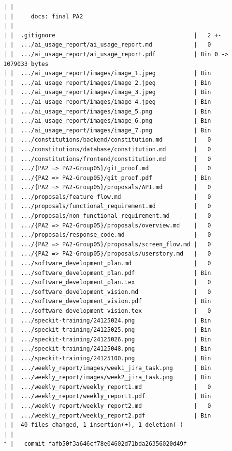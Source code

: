 \documentclass[12pt]{article}
\begin{document}
\begin{lstlisting}[numbers=none,breaklines=true]
| |
| |     docs: final PA2
| |
| |  .gitignore                                        |   2 +-
| |  .../ai_usage_report/ai_usage_report.md            |   0
| |  .../ai_usage_report/ai_usage_report.pdf           | Bin 0 -> 1079033 bytes
| |  .../ai_usage_report/images/image_1.jpeg           | Bin
| |  .../ai_usage_report/images/image_2.jpeg           | Bin
| |  .../ai_usage_report/images/image_3.jpeg           | Bin
| |  .../ai_usage_report/images/image_4.jpeg           | Bin
| |  .../ai_usage_report/images/image_5.png            | Bin
| |  .../ai_usage_report/images/image_6.png            | Bin
| |  .../ai_usage_report/images/image_7.png            | Bin
| |  .../constitutions/backend/constitution.md         |   0
| |  .../constitutions/database/constitution.md        |   0
| |  .../constitutions/frontend/constitution.md        |   0
| |  .../{PA2 => PA2-Group05}/git_proof.md             |   0
| |  .../{PA2 => PA2-Group05}/git_proof.pdf            | Bin
| |  .../{PA2 => PA2-Group05}/proposals/API.md         |   0
| |  .../proposals/feature_flow.md                     |   0
| |  .../proposals/functional_requirement.md           |   0
| |  .../proposals/non_functional_requirement.md       |   0
| |  .../{PA2 => PA2-Group05}/proposals/overview.md    |   0
| |  .../proposals/response_code.md                    |   0
| |  .../{PA2 => PA2-Group05}/proposals/screen_flow.md |   0
| |  .../{PA2 => PA2-Group05}/proposals/userstory.md   |   0
| |  .../software_development_plan.md                  |   0
| |  .../software_development_plan.pdf                 | Bin
| |  .../software_development_plan.tex                 |   0
| |  .../software_development_vision.md                |   0
| |  .../software_development_vision.pdf               | Bin
| |  .../software_development_vision.tex               |   0
| |  .../speckit-training/24125024.png                 | Bin
| |  .../speckit-training/24125025.png                 | Bin
| |  .../speckit-training/24125026.png                 | Bin
| |  .../speckit-training/24125048.png                 | Bin
| |  .../speckit-training/24125100.png                 | Bin
| |  .../weekly_report/images/week1_jira_task.png      | Bin
| |  .../weekly_report/images/week2_jira_task.png      | Bin
| |  .../weekly_report/weekly_report1.md               |   0
| |  .../weekly_report/weekly_report1.pdf              | Bin
| |  .../weekly_report/weekly_report2.md               |   0
| |  .../weekly_report/weekly_report2.pdf              | Bin
| |  40 files changed, 1 insertion(+), 1 deletion(-)
| |
* |   commit fafb50f3a646cf78e04602d71bda26356020d49f

\end{lstlisting}
\end{document}
